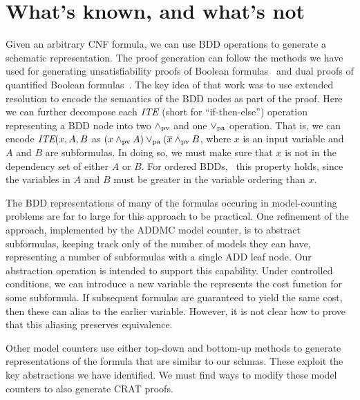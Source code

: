 \documentclass{llncs}
\newcommand{\pand}{\mathbin{\land_{\rm pv}}}
\newcommand{\por}{\mathbin{\lor_{\rm pa}}}
\newcommand{\obar}[1]{\overline{#1}}
\newcommand{\ite}{\mbox{\it ITE}}
\begin{document}
\section{What's known, and what's not}

Given an arbitrary CNF formula, we can use BDD operations to generate
a schematic representation.  The proof generation can follow the
methods we have used for generating unsatisfiability proofs of Boolean
formulas~\cite{bryant:tacas:2021} and dual proofs of quantified
Boolean formulas~\cite{bryant:cade:2021}.  The key idea of that work
was to use extended resolution to encode the semantics of the BDD
nodes as part of the proof.  Here we can further decompose each $\ite$
(short for ``if-then-else'') operation representing a BDD node into
two $\pand$ and one $\por$ operation.  That is, we can encode
$\ite(x,A,B$ as $(x \pand A) \por (\obar{x} \pand B$, where $x$ is an
input variable and $A$ and $B$ are subformulas.  In doing so, we must
make sure that $x$ is not in the dependency set of either $A$ or $B$.
For ordered BDDs,~\cite{Bryant:1986} this property holds, since the
variables in $A$ and $B$ must be greater in the variable ordering than
$x$.

The BDD representations of many of the formulas occuring in
model-counting problems are far to large for this approach to be
practical.  One refinement of the approach, implemented by the ADDMC
model counter, is to abstract subformulas, keeping track only of the
number of models they can have, representing a number of subformulas
with a single ADD leaf node.  Our abstraction operation is intended to
support this capability.  Under controlled conditions, we can
introduce a new variable the represents the cost function for some
subformula.  If subsequent formulas are guaranteed to yield the same
cost, then these can alias to the earlier variable.  However, it is
not clear how to prove that this aliasing preserves equivalence.

Other model counters use either top-down and bottom-up methods to
generate representations of the formula that are similar to our
schmas.  These exploit the key abstractions we have identified.  We
must find ways to modify these model counters to also generate CRAT
proofs.




\end{document}
